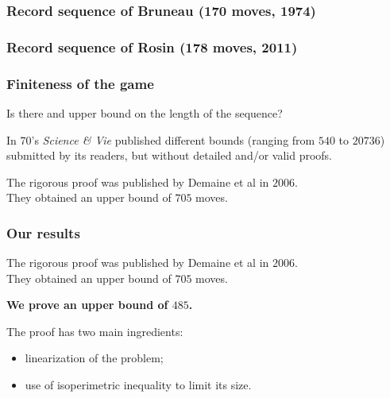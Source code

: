 \documentclass[pdftex]{beamer}
\begin{document}
\begin{frame}
\frametitle{Record sequence of Bruneau (170 moves, 1974)}
\vspace*{-5mm}
\begin{center}

\end{center}
\end{frame}

\begin{frame}
\frametitle{Record sequence of Rosin (178 moves, 2011)}
\vspace*{-5mm}
\begin{center}

\end{center}
\end{frame}

\begin{frame}
\frametitle{Finiteness of the game}

Is there and upper bound on the length of the sequence?

\pause\vspace{10mm}
In 70's {\em Science \& Vie} published different bounds (ranging from $540$ to $20736$) 
  submitted by its readers, but without detailed and/or valid proofs.

\pause\vspace{10mm}
The rigorous proof was published by Demaine et al in $2006$. \\
They obtained an upper bound of $705$ moves.

\end{frame}

\begin{frame}
\frametitle{Our results}

The rigorous proof was published by Demaine et al in $2006$. \\
They obtained an upper bound of $705$ moves.

\vspace{6mm}
{\bf We prove an upper bound of $485$.}

\vspace{6mm}
The proof has two main ingredients:

\vspace{3mm}
\begin{itemize}
  \item linearization of the problem;
  \item use of isoperimetric inequality to limit its size.
\end{itemize}

\end{frame}
\end{document}
